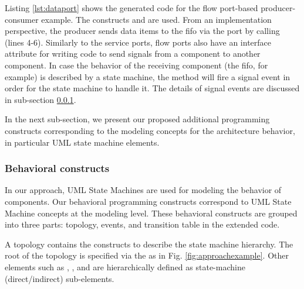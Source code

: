 Listing \ref{lst:dataport} shows the generated code for the flow port-based producer-consumer example.
The constructs  and  are used.
From an implementation perspective, the producer sends data items to the fifo via the port  by calling  (lines 4-6).
Similarly to the service ports, flow ports also have an interface attribute  for writing code to send signals from a component to another component. 
In case the behavior of the receiving component (the fifo, for example) is described by a state machine, the  method will fire a signal event in order for the state machine to handle it. 
The details of signal events are discussed in sub-section \ref{subsec:behavioralconstructs}. 
  

\begin{minipage}{\columnwidth}
	
\end{minipage} 

In the next sub-section, we present our proposed additional programming constructs corresponding to the modeling concepts for the architecture behavior, in particular UML state machine elements.

\subsubsection{Behavioral constructs}
\label{subsec:behavioralconstructs}
In our approach, UML State Machines are used for modeling the behavior of components. 
Our behavioral programming constructs correspond to UML State Machine concepts at the modeling level. 
These behavioral constructs are grouped into three parts: topology, events, and transition table in the extended code.


\noindent
{}
A topology contains the constructs to describe the state machine hierarchy.
The root of the topology is specified via the  as in Fig. \ref{fig:approachexample}.
Other elements such as , , and  are hierarchically defined as state-machine (direct/indirect) sub-elements.

